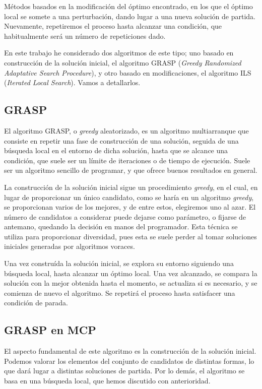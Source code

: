 Métodos basados en la modificación del óptimo encontrado, en los que el óptimo local se somete
a una perturbación, dando lugar a una nueva solución de partida. Nuevamente, repetiremos el
proceso hasta alcanzar una condición, que habitualmente será un número de repeticiones dado.

En este trabajo he considerado dos algoritmos de este tipo; uno basado en construcción de la solución
inicial, el algoritmo GRASP (\textit{Greedy Randomized Adaptative Search Procedure}), y otro basado
en modificaciones, el algoritmo ILS (\textit{Iterated Local Search}). Vamos a detallarlos.

\subsection{GRASP}

El algoritmo GRASP, o \textit{greedy} aleatorizado, es un algoritmo multiarranque que consiste en repetir
una fase de construcción de una solución, seguida de una búsqueda local en el entorno de dicha solución,
hasta que se alcance una condición, que suele ser un límite de iteraciones o de tiempo de ejecución.
Suele ser un algoritmo sencillo de programar, y que ofrece buenos resultados en general.

La construcción de la solución inicial sigue un procedimiento \textit{greedy}, en el cual, en lugar de
proporcionar un único candidato, como se haría en un algoritmo \textit{greedy}, se proporcionan
varios de los mejores, y de entre estos, elegiremos uno al azar. El número de candidatos a considerar
puede dejarse como parámetro, o fijarse de antemano, quedando la decisión en manos del programador.
Esta técnica se utiliza para proporcionar diversidad, pues esta se suele perder al tomar soluciones iniciales
generadas por algoritmos voraces.

Una vez construída la solución inicial, se explora su entorno siguiendo una búsqueda local, hasta alcanzar
un óptimo local. Una vez alcanzado, se compara la solución con la mejor obtenida hasta el momento, se
actualiza si es necesario, y se comienza de nuevo el algoritmo. Se repetirá el proceso hasta satisfacer
una condición de parada.

\subsection{GRASP en MCP}

El aspecto fundamental de este algoritmo es la construcción de la solución inicial. Podemos valorar
los elementos del conjunto de candidatos de distintas formas, lo que dará lugar a distintas soluciones
de partida. Por lo demás, el algoritmo se basa en una búsqueda local, que hemos discutido con anterioridad.

